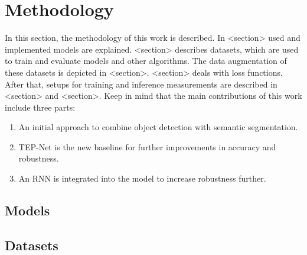 \chapter{Methodology}
\label{sec:methodology}


In this section, the methodology of this work is described.
In <section> used and implemented models are explained.
<section> describes datasets, which are used to train and evaluate models and other algorithms.
The data augmentation of these datasets is depicted in <section>.
<section> deals with loss functions. After that, setups for training and inference measurements are described in <section> and <section>.
Keep in mind that the main contributions of this work include three parts:

\begin{enumerate}
    \item An initial approach to combine object detection with semantic segmentation.
    \item TEP-Net \cite{tepNet2024} is the new baseline for further improvements in accuracy and robustness.
    \item An RNN is integrated into the model to increase robustness further.
\end{enumerate}


\section{Models}
%

%


\section{Datasets}


